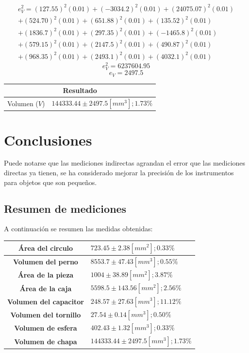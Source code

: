 \documentclass[letter,11pt]{article}
\begin{document}
\begin{equation*}
\begin{split}
    e_V^2 = (127.55)^2(0.01)+(-3034.2)^2(0.01)+(24075.07)^2(0.01) \\
        +(524.70)^2(0.01)+(651.88)^2(0.01)+(135.52)^2(0.01) \\
        +(1836.7)^2(0.01)+(297.35)^2(0.01)+(-1465.8)^2(0.01) \\
        +(579.15)^2(0.01)+(2147.5)^2(0.01)+(490.87)^2(0.01) \\
        +(968.35)^2(0.01)+(2493.1)^2(0.01)+(4032.1)^2(0.01) 
\end{split}
\end{equation*}
\begin{equation*}
    e_V^2 = 6237604.95
\end{equation*}
\begin{equation*}
    e_V = 2497.5
\end{equation*}

\begin{center}
\begin{tabular}{|c|>{\centering}m{7.0cm}<{\centering}|}
\hline
\multicolumn{2}{|c|}{\textbf{Resultado}}
\tabularnewline \hline
Volumen ($V$) & $144333.44\pm2497.5 [mm^3]; 1.73\%$ \tabularnewline \hline
\end{tabular}
\end{center}

\section{Conclusiones}
Puede notarse que las mediciones indirectas agrandan el error que las mediciones
directas ya tienen, se ha considerado mejorar la precisión de los instrumentos
para objetos que son pequeños.

\subsection{Resumen de mediciones}
A continuación se resumen las medidas obtenidas:

\begin{center}
\begin{tabular}{|c|>{\centering}m{6.0cm}<{\centering}|}
\hline
     \textbf{Área del circulo} & $723.45 \pm 2.38 [mm^2]; 0.33\%$
\tabularnewline \hline
    \textbf{Volumen del perno} & $8553.7 \pm 47.43 [mm^3]; 0.55\%$
\tabularnewline \hline
     \textbf{Área de la pieza} & $1004\pm38.89 [mm^2]; 3.87\%$
\tabularnewline \hline
      \textbf{Área de la caja} & $5598.5\pm143.56[mm^2]; 2.56\%$
\tabularnewline \hline
\textbf{Volumen del capacitor} & $248.57\pm27.63 [mm^3]; 11.12\%$
\tabularnewline \hline
 \textbf{Volumen del tornillo} & $27.54\pm0.14 [mm^3]; 0.50\%$
\tabularnewline \hline
    \textbf{Volumen de esfera} & $402.43 \pm 1.32 [mm^3]; 0.33\%$
\tabularnewline \hline
     \textbf{Volumen de chapa} & $144333.44\pm2497.5 [mm^3]; 1.73\%$
\tabularnewline \hline
\end{tabular}\\
\end{center}
\end{document}
